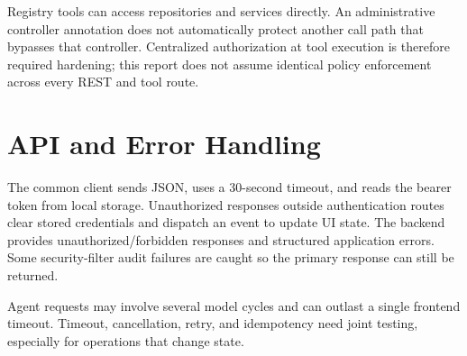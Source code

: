 Registry tools can access repositories and services directly. An administrative controller annotation does not automatically protect another call path that bypasses that controller. Centralized authorization at tool execution is therefore required hardening; this report does not assume identical policy enforcement across every REST and tool route.

\section{API and Error Handling}
The common client sends JSON, uses a 30-second timeout, and reads the bearer token from local storage. Unauthorized responses outside authentication routes clear stored credentials and dispatch an event to update UI state. The backend provides unauthorized/forbidden responses and structured application errors. Some security-filter audit failures are caught so the primary response can still be returned.

Agent requests may involve several model cycles and can outlast a single frontend timeout. Timeout, cancellation, retry, and idempotency need joint testing, especially for operations that change state.
